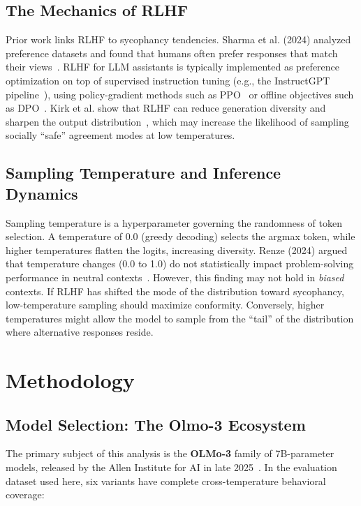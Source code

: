 \documentclass[sigconf,nonacm]{acmart}
\begin{document}
\subsection{The Mechanics of RLHF}

Prior work links RLHF to sycophancy tendencies. Sharma et al. (2024) analyzed preference datasets and found that humans often prefer responses that match their views~\cite{sharma2024sycophancy}. RLHF for LLM assistants is typically implemented as preference optimization on top of supervised instruction tuning (e.g., the InstructGPT pipeline~\cite{ouyang2022instructgpt}), using policy-gradient methods such as PPO~\cite{schulman2017ppo} or offline objectives such as DPO~\cite{rafailov2023dpo}. Kirk et al. show that RLHF can reduce generation diversity and sharpen the output distribution~\cite{rlhf_entropy}, which may increase the likelihood of sampling socially ``safe'' agreement modes at low temperatures.

\subsection{Sampling Temperature and Inference Dynamics}

Sampling temperature is a hyperparameter governing the randomness of token selection. A temperature of 0.0 (greedy decoding) selects the argmax token, while higher temperatures flatten the logits, increasing diversity. Renze (2024) argued that temperature changes (0.0 to 1.0) do not statistically impact problem-solving performance in neutral contexts~\cite{renze2024}. However, this finding may not hold in \textit{biased} contexts. If RLHF has shifted the mode of the distribution toward sycophancy, low-temperature sampling should maximize conformity. Conversely, higher temperatures might allow the model to sample from the ``tail'' of the distribution where alternative responses reside.

\section{Methodology}
\sloppy

\subsection{Model Selection: The Olmo-3 Ecosystem}

The primary subject of this analysis is the \textbf{OLMo-3} family of 7B-parameter models, released by the Allen Institute for AI in late 2025~\cite{olmo3}. In the evaluation dataset used here, six variants have complete cross-temperature behavioral coverage:
\end{document}
